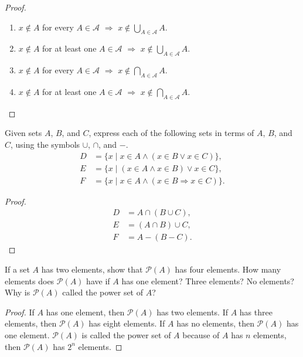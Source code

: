 \begin{proof}
    \begin{enumerate}[label={(\alph*)}]
        \item $x\notin A$ for every $A\in\mathscr{A}$ $\Rightarrow$ $x\notin \bigcup_{A\in\mathscr{A}} A$.
        \item $x\notin A$ for at least one $A\in\mathscr{A}$ $\Rightarrow$ $x\notin \bigcup_{A\in\mathscr{A}} A$.
        \item $x\notin A$ for every $A\in\mathscr{A}$ $\Rightarrow$ $x\notin \bigcap_{A\in\mathscr{A}} A$.
        \item $x\notin A$ for at least one $A\in\mathscr{A}$ $\Rightarrow$ $x\notin \bigcap_{A\in\mathscr{A}} A$.
    \end{enumerate}
\end{proof}

\begin{exercise}\label{chapter1:section1:exercise7}
    Given sets $A$, $B$, and $C$, express each of the following sets in terms of $A$, $B$, and $C$, using the symbols $\cup$, $\cap$, and $-$.
    \begin{align*}
        D & = \{ x \mid x \in A \land (x \in B \lor x \in C) \},        \\
        E & = \{ x \mid (x \in A \land x \in B) \lor x \in C \},        \\
        F & = \{ x \mid x \in A \land (x \in B \Rightarrow x \in C) \}.
    \end{align*}
\end{exercise}

\begin{proof}
    \begin{align*}
        D & = A \cap (B\cup C), \\
        E & = (A\cap B)\cup C,  \\
        F & = A - (B - C).
    \end{align*}
\end{proof}

\begin{exercise}\label{chapter1:section1:exercise8}
    If a set $A$ has two elements, show that $\mathscr{P}(A)$ has four elements. How many elements does $\mathscr{P}(A)$ have if $A$ has one element? Three elements? No elements? Why is $\mathscr{P}(A)$ called the power set of $A$?
\end{exercise}

\begin{proof}
    If $A$ has one element, then $\mathscr{P}(A)$ has two elements. If $A$ has three elements, then $\mathscr{P}(A)$ has eight elements. If $A$ has no elements, then $\mathscr{P}(A)$ has one element. $\mathscr{P}(A)$ is called the power set of $A$ because of $A$ has $n$ elements, then $\mathscr{P}(A)$ has $2^{n}$ elements.
\end{proof}


